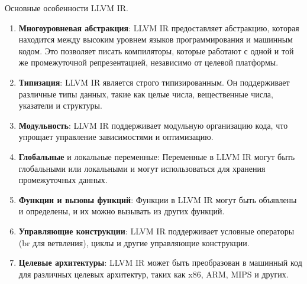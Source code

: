 Основные особенности LLVM IR.
\begin{enumerate}
  \item \textbf{Многоуровневая абстракция}: LLVM IR предоставляет абстракцию, которая находится между высоким уровнем языков программирования и машинным кодом. Это позволяет писать компиляторы, которые работают с одной и той же промежуточной репрезентацией, независимо от целевой платформы.
  \item \textbf{Типизация}: LLVM IR является строго типизированным. Он поддерживает различные типы данных, такие как целые числа, вещественные числа, указатели и структуры.
  \item \textbf{Модульность}: LLVM IR поддерживает модульную организацию кода, что упрощает управление зависимостями и оптимизацию.
  \item \textbf{Глобальные} и локальные переменные: Переменные в LLVM IR могут быть глобальными или локальными и могут использоваться для хранения промежуточных данных.
  \item \textbf{Функции и вызовы функций}: Функции в LLVM IR могут быть объявлены и определены, и их можно вызывать из других функций.
  \item \textbf{Управляющие конструкции}: LLVM IR поддерживает условные операторы (br для ветвления), циклы и другие управляющие конструкции.
  \item \textbf{Целевые архитектуры}: LLVM IR может быть преобразован в машинный код для различных целевых архитектур, таких как x86, ARM, MIPS и других.
  
\end{enumerate}






